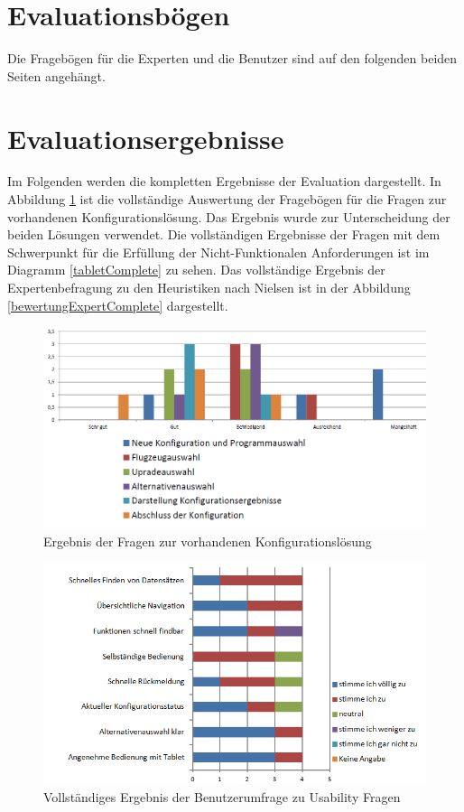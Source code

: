  
\section{Evaluationsbögen} \label{anhangEva}
Die Fragebögen für die Experten und die Benutzer sind auf den folgenden beiden Seiten angehängt.




\section{Evaluationsergebnisse} \label{anhangEvaErg}
Im Folgenden werden die kompletten Ergebnisse der Evaluation dargestellt. In Abbildung \ref{bewertungWebguiComplete} ist die vollständige Auswertung der Fragebögen für die Fragen zur vorhandenen Konfigurationslösung. Das Ergebnis wurde zur Unterscheidung der beiden Lösungen verwendet. Die vollständigen Ergebnisse der Fragen mit dem Schwerpunkt für die Erfüllung der Nicht-Funktionalen Anforderungen ist im Diagramm \ref{tabletComplete} zu sehen. Das vollständige Ergebnis der Expertenbefragung zu den Heuristiken nach Nielsen ist in der Abbildung \ref{bewertungExpertComplete} dargestellt. \par 
\begin{figure}[H]
\centering
\includegraphics[width=\hsize]{images/bewertung_webgui}
\caption{Ergebnis der Fragen zur vorhandenen Konfigurationslösung}
\label{bewertungWebguiComplete}
\end{figure}
\begin{figure}
\centering
\includegraphics[width=\hsize]{images/bewertung_tabletComplete}
\caption{Vollständiges Ergebnis der Benutzerumfrage zu Usability Fragen}
\label{bewertungTabletComplete}
\end{figure}
